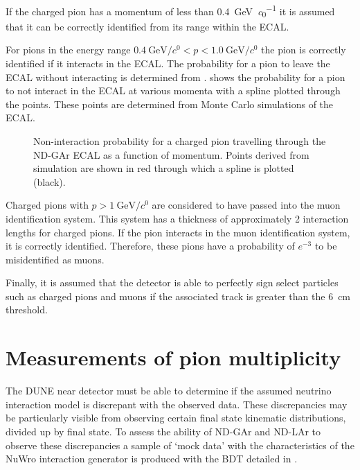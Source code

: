 If the charged pion has a momentum of less than \SI{0.4}{\GeV\per\clight} it is assumed that it can be correctly identified from its range within the ECAL.

For pions in the energy range $\SI{0.4}{\GeV\per\clight} < p < \SI{1.0}{\GeV\per\clight}$ the pion is correctly identified if it interacts in the ECAL.
The probability for a pion to leave the ECAL without interacting is determined from .
 shows the probability for a pion to not interact in the ECAL at various momenta with a spline plotted through the points.
These points are determined from Monte Carlo simulations of the ECAL.

\begin{figure}[h]
	\centering
	\begin{adjustbox}{max totalsize=.6\linewidth, center}
		
	\end{adjustbox}
	\caption[Non-interaction probability for a charged pion travelling through the ND-GAr ECAL as a function of momentum]{Non-interaction probability for a charged pion travelling through the ND-GAr ECAL as a function of momentum. Points derived from simulation are shown in red through which a spline is plotted (black).}
	\label{fig:interactionSpline}
\end{figure}

Charged pions with $p>\SI{1}{\GeV\per\clight}$ are considered to have passed into the muon identification system. 
This system has a thickness of approximately 2 interaction lengths for charged pions.
If the pion interacts in the muon identification system, it is correctly identified.
Therefore, these pions have a probability of $e^{-3}$ to be misidentified as muons.

Finally, it is assumed that the detector is able to perfectly sign select particles such as charged pions and muons if the associated track is greater than the \SI{6}{\cm} threshold.

\section{Measurements of pion multiplicity}
\label{sec:dune_ndrwt:pionMulti}

The DUNE near detector must be able to determine if the assumed neutrino interaction model is discrepant with the observed data.
These discrepancies may be particularly visible from observing certain final state kinematic distributions, divided up by final state.
To assess the ability of ND-GAr and ND-LAr to observe these discrepancies a sample of `mock data' with the characteristics of the NuWro interaction generator is produced with the BDT detailed in .

